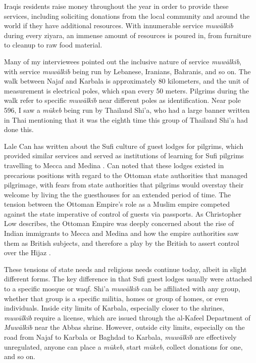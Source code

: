 Iraqis residents raise money throughout the year in order to provide these services, including soliciting donations from the local community and around the world if they have additional resources. With innumerable service \emph{muwālkib} during every ziyara, an immense amount of resources is poured in, from furniture to cleanup to raw food material.

Many of my interviewees pointed out the inclusive nature of service \emph{muwālkib}, with service \emph{muwālkib} being run by Lebanese, Iranians, Bahranis, and so on. The walk between Najaf and Karbala is approximately 80 kilometers, and the unit of measurement is electrical poles, which span every 50 meters. Pilgrims during the walk refer to specific \emph{muwālkib} near different poles as identification. Near pole 596, I saw a \emph{mūkeb} being run by Thailand Shi'a, who had a large banner written in Thai mentioning that it was the eighth time this group of Thailand Shi'a had done this. 

Lale Can has written about the Sufi culture of guest lodges for pilgrims, which provided similar services and served as institutions of learning for Sufi pilgrims travelling to Mecca and Medina \cite{can_spiritual_2020}. Can noted that these lodges existed in precarious positions with regard to the Ottoman state authorities that managed pilgrimage, with fears from state authorities that pilgrims would overstay their welcome by living the the guesthouses for an extended period of time. The tension between the Ottoman Empire's role as a Muslim empire competed against the state imperative of control of guests via passports. As Christopher Low describes, the Ottoman Empire was deeply concerned about the rise of Indian immigrants to Mecca and Medina and how the empire authorities saw them as British subjects, and therefore a play by the British to assert control over the Hijaz \cite{low_imperial_2020}. 

These tensions of state needs and religious needs continue today, albeit in slight different forms. The key difference in that Sufi guest lodges usually were attached to a specific mosque or waqf. Shi'a \emph{muwālkib} can be affiliated with any group, whether that group is a specific militia, homes or group of homes, or even individuals. Inside city limits of Karbala, especially closer to the shrines, \emph{muwālkib} require a license, which are issued through the al-Kafeel Department of \emph{Muwālkib} near the Abbas shrine. However, outside city limits, especially on the road from Najaf to Karbala or Baghdad to Karbala, \emph{muwālkib} are effectively unregulated, anyone can place a \emph{mūkeb}, start \emph{mūkeb}, collect donations for one, and so on. 

